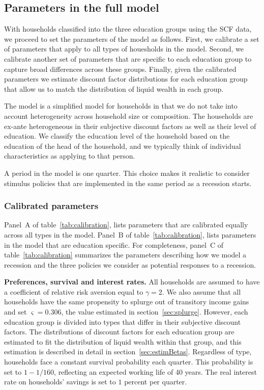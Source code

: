 \documentclass[\econtexRoot/HAFiscal]{subfiles}
\begin{document}
\subsection{Parameters in the full model}
\notinsubfile{\label{sec:paramsFull}}

With households classified into the three education groups using the SCF data, we proceed to set the parameters of the model as follows.
First, we calibrate a set of parameters that apply to all types of houesholds in the model.
Second, we calibrate another set of parameters that are specific to each education group to capture broad differences across these groups.
Finally, given the calibrated parameters we estimate discount factor distributions for each education group that allow us to match the distribution of liquid wealth in each group.


The model is a simplified model for households in that we do not take into account heterogeneity across household size or composition.
The households are ex-ante heterogeneous in their subjective discount factors as well as their level of education.
We classify the education level of the household based on the education of the head of the household, and we typically think of individual characteristics as applying to that person.


A period in the model is one quarter.
This choice makes it realistic to consider stimulus policies that are implemented in the same period as a recession starts.


\subsubsection{Calibrated parameters} 
\notinsubfile{\label{sec:calib}}

Panel~A of table~\ref{tab:calibration}, lists parameters that are calibrated equally across all types in the model.
Panel~B of table~\ref{tab:calibration}, lists parameters in the model that are education specific.
For completeness, panel~C of table~\ref{tab:calibration} summarizes the parameters describing how we model a recession and the three policies we consider as potential responses to a recession.


\textbf{Preferences, survival and interest rates.} All households are assumed to have a coefficient of relative risk aversion equal to $\gamma=2$.
We also assume that all households have the same propensity to splurge out of transitory income gains and set $\varsigma=0.306$, the value estimated in section~\ref{sec:splurge}.
However, each education group is divided into types that differ in their subjective discount factors.
The distributions of discount factors for each education group are estimated to fit the distribution of liquid wealth within that group, and this estimation is described in detail in section~\ref{sec:estimBetas}.
Regardless of type, households face a constant survival probability each quarter.
This probability is set to $1-1/160$, reflecting an expected working life of 40 years.
The real interest rate on households' savings is set to $1$ percent per quarter.
\end{document}
